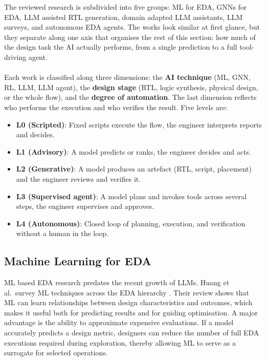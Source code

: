 \documentclass[conference]{IEEEtran}
\begin{document}
The reviewed research is subdivided into five groups: ML for EDA, GNNs for EDA, LLM assisted RTL generation, domain adapted LLM assistants, LLM surveys, and autonomous EDA agents. The works look similar at first glance, but they separate along one axis that organises the rest of this section: how much of the design task the AI actually performs, from a single prediction to a full tool-driving agent.
\\\\
Each work is classified along three dimensions: the \textbf{AI technique} (ML, GNN, RL, LLM, LLM agent), the \textbf{design stage} (RTL, logic synthesis, physical design, or the whole flow), and the \textbf{degree of automation}. The last dimension reflects who performs the execution and who verifies the result. Five levels are: 
\begin{itemize}
    \item \textbf{L0 (Scripted)}: Fixed scripts execute the flow, the engineer interprets reports and decides.
    \item \textbf{L1 (Advisory)}: A model predicts or ranks, the engineer decides and acts.
    \item \textbf{L2 (Generative)}: A model produces an artefact (RTL, script, placement) and the engineer reviews and verifies it.
    \item \textbf{L3 (Supervised agent)}: A model plans and invokes tools across several steps, the engineer supervises and approves.
    \item \textbf{L4 (Autonomous)}: Closed loop of planning, execution, and verification without a human in the loop.
\end{itemize}


\subsection{Machine Learning for EDA} \label{L1}

\noindent ML based EDA research predates the recent growth of LLMs. Huang et al.\ survey ML techniques across the EDA hierarchy \cite{P1_Huang2021}. Their review shows that ML can learn relationships between design characteristics and outcomes, which makes it useful both for predicting results and for guiding optimisation. A major advantage is the ability to approximate expensive evaluations. If a model accurately predicts a design metric, designers can reduce the number of full EDA executions required during exploration, thereby allowing ML to serve as a surrogate for selected operations.\\
\end{document}

